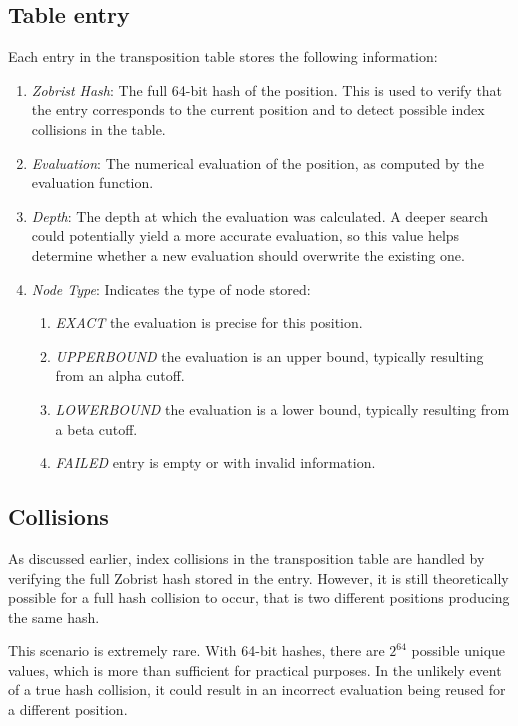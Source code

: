 \subsection*{Table entry}

Each entry in the transposition table stores the following information:

\begin{enumerate}
  \item \textit{Zobrist Hash}: The full 64-bit hash of the position. This is used to verify that the entry corresponds to the current position and to detect possible index collisions in the table.
  \item \textit{Evaluation}: The numerical evaluation of the position, as computed by the evaluation function.
  \item \textit{Depth}: The depth at which the evaluation was calculated. A deeper search could potentially yield a more accurate evaluation, so this value helps determine whether a new evaluation should overwrite the existing one.
  \item \textit{Node Type}: Indicates the type of node stored:
  \begin{enumerate}
    \item \textit{EXACT} the evaluation is precise for this position.
    \item \textit{UPPERBOUND} the evaluation is an upper bound, typically resulting from an alpha cutoff.
    \item \textit{LOWERBOUND} the evaluation is a lower bound, typically resulting from a beta cutoff.
    \item \textit{FAILED} entry is empty or with invalid information.
  \end{enumerate}
\end{enumerate}

\subsection*{Collisions}

As discussed earlier, index collisions in the transposition table are handled by verifying the full Zobrist hash stored in the entry. However, it is still theoretically possible for a full hash collision to occur, that is two different positions producing the same hash.

\vspace{1em}

\noindent This scenario is extremely rare. With 64-bit hashes, there are $2^{64}$ possible unique values, which is more than sufficient for practical purposes. In the unlikely event of a true hash collision, it could result in an incorrect evaluation being reused for a different position.

